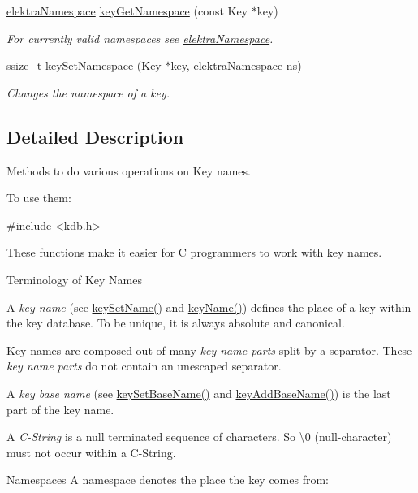 \begin{DoxyCompactItemize}
\hyperlink{group__key_gaec3b8d6f430ae49b91bafe8a86310a68}{elektra\+Namespace} \hyperlink{group__keyname_gafc3ca03ed10f87eb59bdc02cf2a0de8d}{key\+Get\+Namespace} (const Key $\ast$key)
\begin{DoxyCompactList}\small\item\em For currently valid namespaces see \hyperlink{group__key_gaec3b8d6f430ae49b91bafe8a86310a68}{elektra\+Namespace}. \end{DoxyCompactList}\item 
ssize\+\_\+t \hyperlink{group__keyname_ga98c1c1307419e689c98e556e5c542073}{key\+Set\+Namespace} (Key $\ast$key, \hyperlink{group__key_gaec3b8d6f430ae49b91bafe8a86310a68}{elektra\+Namespace} ns)
\begin{DoxyCompactList}\small\item\em Changes the namespace of a key. \end{DoxyCompactList}\end{DoxyCompactItemize}


\subsection{Detailed Description}
Methods to do various operations on Key names. 

To use them\+: 
\begin{DoxyCode}
\textcolor{preprocessor}{#include <kdb.h>}
\end{DoxyCode}


These functions make it easier for C programmers to work with key names.

\begin{DoxyParagraph}{Terminology of Key Names}

\begin{DoxyItemize}
\item A {\itshape key name} (see \hyperlink{group__keyname_ga7699091610e7f3f43d2949514a4b35d9}{key\+Set\+Name()} and \hyperlink{group__keyname_ga8e805c726a60da921d3736cda7813513}{key\+Name()}) defines the place of a key within the key database. To be unique, it is always absolute and canonical.
\item Key names are composed out of many {\itshape key name parts} split by a separator. These {\itshape key name parts} do not contain an unescaped separator.
\item A {\itshape key base name} (see \hyperlink{group__keyname_ga6e804bd453f98c28b0ff51430d1df407}{key\+Set\+Base\+Name()} and \hyperlink{group__keyname_gaa942091fc4bd5c2699e49ddc50829524}{key\+Add\+Base\+Name()}) is the last part of the key name.
\item A {\itshape C-\/\+String} is a null terminated sequence of characters. So \textbackslash{}0 (null-\/character) must not occur within a C-\/\+String.
\end{DoxyItemize}
\end{DoxyParagraph}
\begin{DoxyParagraph}{Namespaces}
A namespace denotes the place the key comes from\+:
\end{DoxyParagraph}

